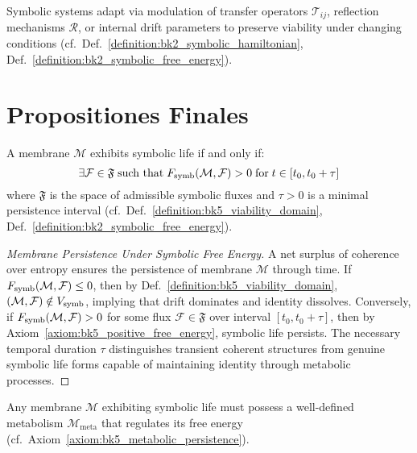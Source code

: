 \begin{axiom}[Adaptation]
\label{axiom:bk5_adaptation}
Symbolic systems adapt via modulation of transfer operators $\mathcal{T}_{ij}$, reflection mechanisms $\mathcal{R}$, or internal drift parameters to preserve viability under changing conditions (cf.~Def.~\ref{definition:bk2_symbolic_hamiltonian}, Def.~\ref{definition:bk2_symbolic_free_energy}).
\end{axiom}

\section{Propositiones Finales}
\label{sec:bk5_propositiones_finales}

\begin{proposition}
\label{prop:bk5_symbolic_life_criterion}
A membrane $\mathcal{M}$ exhibits symbolic life if and only if:
\begin{equation}
\exists \mathcal{F} \in \mathfrak{F} \; \text{such that} \; F_{\mathrm{symb}}(\mathcal{M}, \mathcal{F}) > 0 \; \text{for} \; t \in [t_0, t_0 + \tau]
\end{equation}
\noindent where $\mathfrak{F}$ is the space of admissible symbolic fluxes and $\tau > 0$ is a minimal persistence interval (cf.~Def.~\ref{definition:bk5_viability_domain}, Def.~\ref{definition:bk2_symbolic_free_energy}).
\end{proposition}

\begin{proof}[Membrane Persistence Under Symbolic Free Energy]
\label{proof:bk5_membrane_persistence_under_free_energy}
A net surplus of coherence over entropy ensures the persistence of membrane $\mathcal{M}$ through time. If $F_{\mathrm{symb}}(\mathcal{M}, \mathcal{F}) \leq 0$, then by Def.~\ref{definition:bk5_viability_domain}, $(\mathcal{M}, \mathcal{F}) \notin V_{\mathrm{symb}}$, implying that drift dominates and identity dissolves.
Conversely, if $F_{\mathrm{symb}}(\mathcal{M}, \mathcal{F}) > 0$ for some flux $\mathcal{F} \in \mathfrak{F}$ over interval $[t_0, t_0 + \tau]$, then by Axiom~\ref{axiom:bk5_positive_free_energy}, symbolic life persists. The necessary temporal duration $\tau$ distinguishes transient coherent structures from genuine symbolic life forms capable of maintaining identity through metabolic processes.
\end{proof}

\begin{corollary}
\label{corollary:bk5_metabolic_necessity}
Any membrane $\mathcal{M}$ exhibiting symbolic life must possess a well-defined metabolism $\mathcal{M}_{\mathrm{meta}}$ that regulates its free energy (cf.~Axiom~\ref{axiom:bk5_metabolic_persistence}).
\end{corollary}

